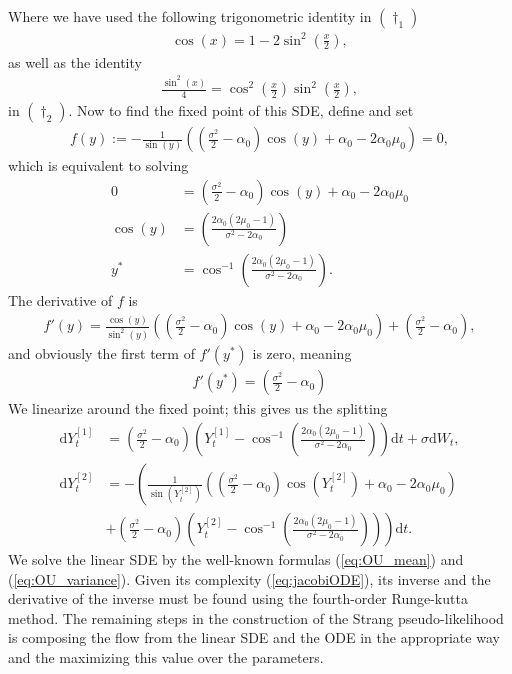 Where we have used the following trigonometric identity in $(\dagger_1)$
\begin{align*}
    \cos(x) = 1 - 2 \sin^2\left(\frac{x}{2}\right),
\end{align*}
as well as the identity
\begin{align*}
    \frac{\sin^2(x)}{4} = \cos^2\left(\frac{x}{2}\right)\sin^2\left(\frac{x}{2}\right),
\end{align*}
in $(\dagger_2)$. Now to find the fixed point of this SDE, define and set
\begin{align}
    f(y) := -\frac{1}{\sin\left(y\right)}\left(\left(\frac{\sigma^2}{2}-\alpha_0\right)\cos(y) + \alpha_0 - 2\alpha_0\mu_0\right) = 0,
\end{align}
which is equivalent to solving
\begin{align}
    0 &= \left(\frac{\sigma^2}{2}-\alpha_0\right)\cos(y) + \alpha_0 - 2\alpha_0\mu_0 \nonumber\\
    \cos(y) &= \left(\frac{2\alpha_0\left(2\mu_0 - 1\right)}{\sigma^2 - 2\alpha_0}\right) \nonumber\\
    y^* &= \cos^{-1}\left(\frac{2\alpha_0\left(2\mu_0 - 1\right)}{\sigma^2 - 2\alpha_0}\right).
\end{align}
The derivative of $f$ is
\begin{align}
    f'(y) = \frac{\cos(y)}{\sin^2\left(y\right)}\left(\left(\frac{\sigma^2}{2}-\alpha_0\right)\cos(y) + \alpha_0 - 2\alpha_0\mu_0\right) + \left(\frac{\sigma^2}{2}-\alpha_0\right),
\end{align}
and obviously the first term of $f'(y^*)$ is zero, meaning
\begin{align}
    f'(y^*) = \left(\frac{\sigma^2}{2}-\alpha_0\right)
\end{align}
We linearize around the fixed point; this gives us the splitting
\begin{align}
    \mathrm{d}Y_t^{[1]} &= \left(\frac{\sigma^2}{2} - \alpha_0\right)\left(Y_t^{[1]} - \cos^{-1}\left(\frac{2\alpha_0\left(2\mu_0 - 1\right)}{\sigma^2 - 2\alpha_0}\right)\right)\mathrm{d}t + \sigma \mathrm{d}W_t,\\
    \mathrm{d}Y_t^{[2]} &= -\left(\frac{1}{\sin\left(Y_t^{[2]}\right)}\left(\left(\frac{\sigma^2}{2}-\alpha_0\right)\cos(Y_t^{[2]}) + \alpha_0 - 2\alpha_0\mu_0\right) \right. \nonumber \\
    &+ \left. \left(\frac{\sigma^2}{2} - \alpha_0\right)\left(Y_t^{[2]} - \cos^{-1}\left(\frac{2\alpha_0\left(2\mu_0 - 1\right)}{\sigma^2 - 2\alpha_0}\right)\right) \right)\mathrm{d}t. \label{eq:jacobiODE}
\end{align}
We solve the linear SDE by the well-known formulas (\ref{eq:OU_mean}) and (\ref{eq:OU_variance}). Given its complexity (\ref{eq:jacobiODE}), its inverse and the derivative of the inverse must be found using the fourth-order Runge-kutta method. The remaining steps in the construction of the Strang pseudo-likelihood is composing the flow from the linear SDE and the ODE in the appropriate way and the maximizing this value over the parameters.
